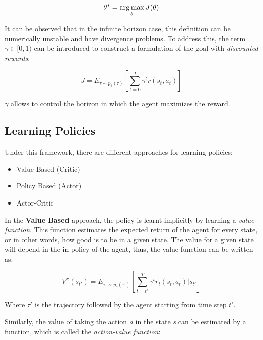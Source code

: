 \begin{equation}
    \theta^{*} = \operatorname*{arg\,max}_{\theta}J(\theta)
\label{eq:objective}
\end{equation}

It can be observed that in the infinite horizon case, this definition can be numerically unstable and have divergence problems. To address this, the term $\gamma \in [0, 1)$ can be introduced to construct a formulation of the goal with \emph{discounted rewards}:

\begin{equation}
    J = E_{\tau \sim p_{\theta}(\tau)} \left[\sum_{t=0}^{T}\gamma^{t}r(s_{t}, a_{t})\right]
\end{equation}

$\gamma$ allows to control the horizon in which the agent maximizes the reward.

\newpage

\subsection{Learning Policies}

Under this framework, there are different approaches for learning policies:

\begin{itemize}
    \item Value Based (Critic)
    \item Policy Based (Actor)
    \item Actor-Critic
\end{itemize}

In the \textbf{Value Based} approach, the policy is learnt implicitly by learning a \emph{value function}. This function estimates the expected return of the agent for every state, or in other words, how good is to be in a given state. The value for a given state will depend in the in policy of the agent, thus, the value function can be written as:

\begin{equation}
    V^{\pi}(s_{t'})  = E_{\tau' \sim p_{\theta}(\tau')}\left[\sum_{t=t'}^{T}\gamma^{t}r_{t}(s_{t}, a_{t})|s_{t'}\right]
\end{equation}

Where $\tau'$ is the trajectory followed by the agent starting from time step $t'$.

Similarly, the value of taking the action \emph{a} in the state \emph{s} can be estimated by a function, which is called the \emph{action-value function}:

